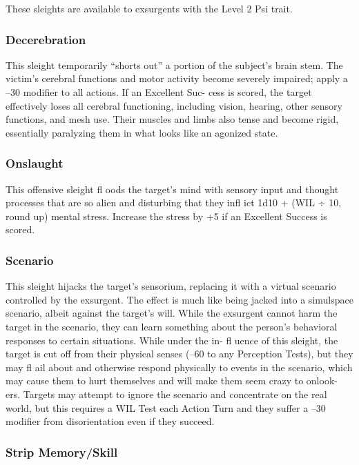 These sleights are available to exsurgents with the 
Level 2 Psi trait.

\subsubsection{Decerebration }

This sleight temporarily ``shorts out'' a portion of the 
subject's brain stem. The victim's cerebral functions 
and motor activity become severely impaired; apply 
a –30 modifier to all actions. If an Excellent Suc-
cess is scored, the target effectively loses all cerebral 
functioning, including vision, hearing, other sensory 
functions, and mesh use. Their muscles and limbs also 
tense and become rigid, essentially paralyzing them in 
what looks like an agonized state.

\subsubsection{Onslaught}


This offensive sleight fl oods the target's mind with 
sensory input and thought processes that are so alien 
and disturbing that they infl ict 1d10 + (WIL ÷ 10, 
round up) mental stress. Increase the stress by +5 if an 
Excellent Success is scored.

\subsubsection{Scenario }

This sleight hijacks the target's sensorium, replacing 
it with a virtual scenario controlled by the exsurgent. 
The effect is much like being jacked into a simulspace 
scenario, albeit against the target's will. While the 
exsurgent cannot harm the target in the scenario, they 
can learn something about the person's behavioral 
responses to certain situations. While under the in-
fl uence of this sleight, the target is cut off from their 
physical senses (–60 to any Perception Tests), but they 
may fl ail about and otherwise respond physically to 
events in the scenario, which may cause them to hurt 
themselves and will make them seem crazy to onlook-
ers. Targets may attempt to ignore the scenario and 
concentrate on the real world, but this requires a WIL 
Test each Action Turn and they suffer a –30 modifier 
from disorientation even if they succeed. 

\subsubsection{Strip Memory/Skill }


